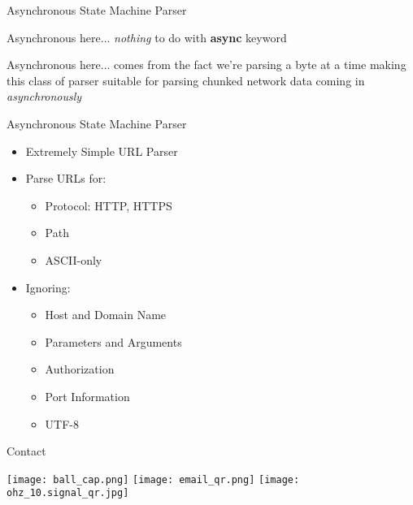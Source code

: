 \documentclass[aspectratio=169]{beamer}
\begin{document}
\begin{frame}{Asynchronous State Machine Parser}
\begin{block}{Asynchronous here...}
\emph{nothing} to do with \textbf{async} keyword
\end{block}
\begin{block}{Asynchronous here...} comes from the fact we're parsing a byte at a time making this class of parser suitable for parsing chunked network data coming in \emph{asynchronously}
\end{block}
\end{frame}

\begin{frame}{Asynchronous State Machine Parser}
\begin{itemize}
\item Extremely Simple URL Parser
\item Parse URLs for:
	\begin{itemize}
	\item Protocol: {HTTP, HTTPS}
	\item Path
	\item ASCII-only
	\end{itemize}
\item Ignoring:
	\begin{itemize}
	\item Host and Domain Name
	\item Parameters and Arguments
	\item Authorization
	\item Port Information
	\item UTF-8
	\end{itemize}
\end{itemize}
\end{frame}

\begin{frame}{Contact}
\begin{center}
\texttt{[image: ball\_cap.png]}
\texttt{[image: email\_qr.png]}
\texttt{[image: ohz\_10.signal\_qr.jpg]}
\end{center}
\end{frame}
\end{document}
